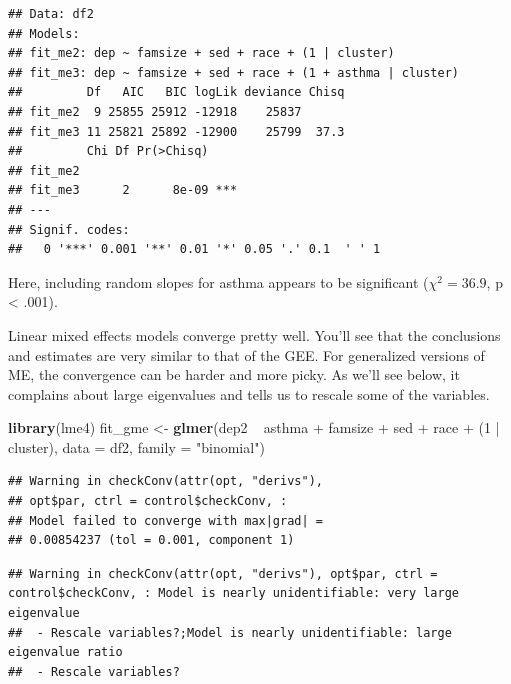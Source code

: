 \documentclass[]{tufte-book}
\newenvironment{Shaded}{}{}
\newcommand{\KeywordTok}[1]{\textcolor[rgb]{0.00,0.44,0.13}{\textbf{#1}}}
\newcommand{\DataTypeTok}[1]{\textcolor[rgb]{0.56,0.13,0.00}{#1}}
\newcommand{\DecValTok}[1]{\textcolor[rgb]{0.25,0.63,0.44}{#1}}
\newcommand{\StringTok}[1]{\textcolor[rgb]{0.25,0.44,0.63}{#1}}
\newcommand{\OperatorTok}[1]{\textcolor[rgb]{0.40,0.40,0.40}{#1}}
\newcommand{\NormalTok}[1]{#1}
\theoremstyle{definition}
\theoremstyle{definition}
\theoremstyle{remark}
\begin{document}
\begin{verbatim}
## Data: df2
## Models:
## fit_me2: dep ~ famsize + sed + race + (1 | cluster)
## fit_me3: dep ~ famsize + sed + race + (1 + asthma | cluster)
##         Df   AIC   BIC logLik deviance Chisq
## fit_me2  9 25855 25912 -12918    25837      
## fit_me3 11 25821 25892 -12900    25799  37.3
##         Chi Df Pr(>Chisq)    
## fit_me2                      
## fit_me3      2      8e-09 ***
## ---
## Signif. codes:  
##   0 '***' 0.001 '**' 0.01 '*' 0.05 '.' 0.1  ' ' 1
\end{verbatim}

Here, including random slopes for asthma appears to be significant
(\(\chi^2 = 36.9\), p \textless{} .001).

Linear mixed effects models converge pretty well. You'll see that the
conclusions and estimates are very similar to that of the GEE. For
generalized versions of ME, the convergence can be harder and more
picky. As we'll see below, it complains about large eigenvalues and
tells us to rescale some of the variables.

\begin{Shaded}
\begin{Highlighting}[]
\KeywordTok{library}\NormalTok{(lme4)}
\NormalTok{fit_gme <-}\StringTok{ }\KeywordTok{glmer}\NormalTok{(dep2 }\OperatorTok{~}\StringTok{ }\NormalTok{asthma }\OperatorTok{+}\StringTok{ }\NormalTok{famsize }\OperatorTok{+}\StringTok{ }\NormalTok{sed }\OperatorTok{+}\StringTok{ }
\StringTok{    }\NormalTok{race }\OperatorTok{+}\StringTok{ }\NormalTok{(}\DecValTok{1} \OperatorTok{|}\StringTok{ }\NormalTok{cluster), }\DataTypeTok{data =}\NormalTok{ df2, }\DataTypeTok{family =} \StringTok{"binomial"}\NormalTok{)}
\end{Highlighting}
\end{Shaded}

\begin{verbatim}
## Warning in checkConv(attr(opt, "derivs"),
## opt$par, ctrl = control$checkConv, :
## Model failed to converge with max|grad| =
## 0.00854237 (tol = 0.001, component 1)
\end{verbatim}

\begin{verbatim}
## Warning in checkConv(attr(opt, "derivs"), opt$par, ctrl = control$checkConv, : Model is nearly unidentifiable: very large eigenvalue
##  - Rescale variables?;Model is nearly unidentifiable: large eigenvalue ratio
##  - Rescale variables?
\end{verbatim}
\end{document}
